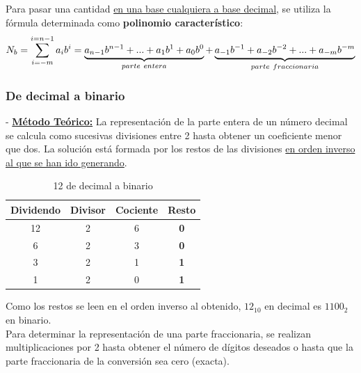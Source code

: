 \documentclass[12pt]{article}
\begin{document}
				Para pasar una cantidad \underline{en una base cualquiera a base decimal}, se utiliza la fórmula determinada como \textbf{polinomio característico}:\\
			
				\begin{equation}
					\notag
					{N}_{b} = \sum_{i=-m}^{i=n-1}{a}_{i}{b}^{i} = \underbrace{{a}_{n-1}{b}^{n-1} + ... + {a}_{1}{b}^{1} + {a}_{0}{b}^{0}}_{parte\ entera} + \underbrace{{a}_{-1}{b}^{-1} + {a}_{-2}{b}^{-2} + ... + {a}_{-m}{b}^{-m}}_{parte\ fraccionaria}
				\end{equation}
			
				\newpage
				
			\subsubsection{De decimal a binario}
			
					- \underline{\textbf{Método Teórico:}} La representación de la parte entera de un número decimal se calcula como sucesivas divisiones entre 2 hasta obtener un coeficiente menor que dos. La solución está formada por los restos de las divisiones \underline{en orden inverso al que se han ido generando}.\\
					
						\begin{table}[H]
							\centering
							\begin{tabular}{cccc}
								Dividendo & Divisor & Cociente & \textbf{Resto} \\
								\toprule
								12 & 2 & 6 & \textbf{0} \\
								6 & 2 & 3 & \textbf{0} \\
								3 & 2 & 1 & \textbf{1} \\
								\midrule
								1 & 2 & 0 & \textbf{1} \\
							\end{tabular}
							\caption*{12 de decimal a binario}
						\end{table}
						
						Como los restos se leen en el orden inverso al obtenido, $12_{10}$ en decimal es $1100_{2}$ en binario.\\
						
						Para determinar la representación de una parte fraccionaria, se realizan multiplicaciones por 2 hasta obtener el número de dígitos deseados o hasta que la parte fraccionaria de la conversión sea cero (exacta).\\
						
\end{document}
